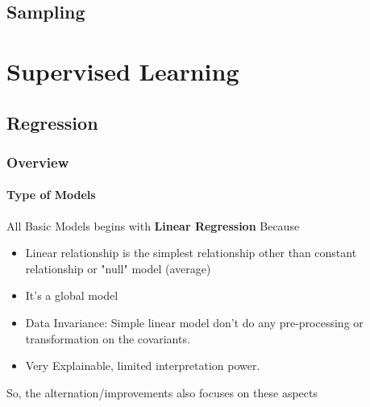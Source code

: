 \documentclass[11pt, openany]{book}              %
\begin{document}
\chapter{Sampling}

\part{Supervised Learning}

\chapter{Regression}

\section{Overview}

\subsection{Type of Models}

All Basic Models begins with \textbf{Linear Regression} Because

\begin{itemize}
    \item Linear relationship is the simplest relationship other than constant relationship or "null" model (average)
    \item It's a global model
    \item Data Invariance: Simple linear model don't do any pre-processing or transformation on the covariants.
    \item Very Explainable, limited interpretation power.
\end{itemize}
 
 So, the alternation/improvements also focuses on these aspects
 
\end{document}
